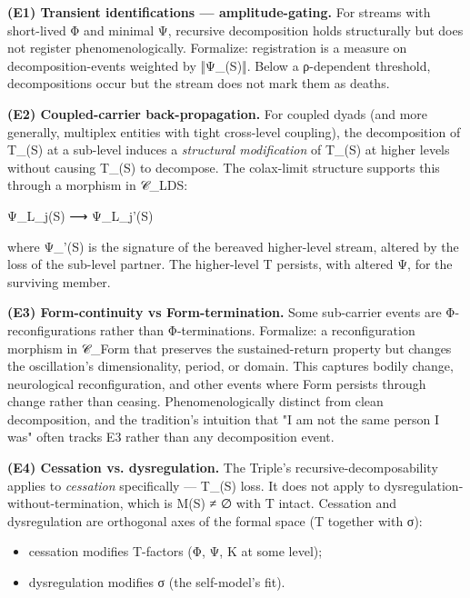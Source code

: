 \documentclass[11pt, openany]{book}
\begin{document}
\textbf{(E1) Transient identifications --- amplitude-gating.}
For streams with short-lived Φ and minimal Ψ, recursive decomposition holds structurally but does not register phenomenologically. Formalize: registration is a measure on decomposition-events weighted by ‖Ψ\_(S)‖. Below a ρ-dependent threshold, decompositions occur but the stream does not mark them as deaths.

\textbf{(E2) Coupled-carrier back-propagation.}
For coupled dyads (and more generally, multiplex entities with tight cross-level coupling), the decomposition of T\_(S) at a sub-level induces a \textit{structural modification} of T\_(S) at higher levels without causing T\_(S) to decompose. The colax-limit structure supports this through a morphism in 𝒞\_\allowbreak{}LDS:
\begin{Code}
Ψ_{L_j}(S) ⟶ Ψ_{L_j}'(S)
\end{Code}
where Ψ\_'(S) is the signature of the bereaved higher-level stream, altered by the loss of the sub-level partner. The higher-level T persists, with altered Ψ, for the surviving member.

\textbf{(E3) Form-continuity vs Form-termination.}
Some sub-carrier events are Φ-reconfigurations rather than Φ-terminations. Formalize: a reconfiguration morphism in 𝒞\_\allowbreak{}Form that preserves the sustained-return property but changes the oscillation's dimensionality, period, or domain. This captures bodily change, neurological reconfiguration, and other events where Form persists through change rather than ceasing. Phenomenologically distinct from clean decomposition, and the tradition's intuition that "I am not the same person I was" often tracks E3 rather than any decomposition event.

\textbf{(E4) Cessation vs. dysregulation.}
The Triple's recursive-decomposability applies to \textit{cessation} specifically --- T\_(S) loss. It does not apply to dysregulation-without-termination, which is M(S) ≠ ∅ with T intact. Cessation and dysregulation are orthogonal axes of the formal space (T together with σ):
\begin{itemize}
\item cessation modifies T-factors (Φ, Ψ, Κ at some level);
\item dysregulation modifies σ (the self-model's fit).
\end{itemize}
\end{document}
